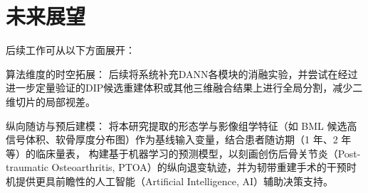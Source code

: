 \section{未来展望}
  后续工作可从以下方面展开：
  \par 算法维度的时空拓展：
  后续将系统补充DANN各模块的消融实验，并尝试在经过进一步定量验证的DIP候选重建体积或其他三维融合结果上进行全局分割，减少二维切片的局部视差。
  \par 纵向随访与预后建模：
  将本研究提取的形态学与影像组学特征（如 BML 候选高信号体积、软骨厚度分布图）作为基线输入变量，结合患者随访期（1 年、2 年等）的临床量表，
  构建基于机器学习的预测模型，以刻画创伤后骨关节炎（Post-traumatic Osteoarthritis, PTOA）的纵向退变轨迹，并为韧带重建手术的干预时机提供更具前瞻性的人工智能（Artificial Intelligence, AI）辅助决策支持。
  
